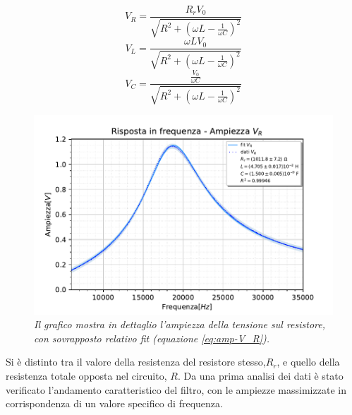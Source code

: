 \begin{equation}\label{eq:amp-V_R}
    V_R = \frac{R_rV_0}{\sqrt{ R^2 +{ \left(\omega L - \frac{1}{\omega C}\right)}^2}}
\end{equation}
\begin{equation}
    V_L = \frac{\omega L V_0}{\sqrt{R^2+{ \left(\omega L - \frac{1}{\omega C}\right)}^2}}
\end{equation}
\begin{equation}
    V_C = \frac{\frac{V_0}{\omega C}}{\sqrt{R^2+{ \left(\omega L - \frac{1}{\omega C}\right)}^2}}
\end{equation}


\begin{figure}[h]
    \centering
    \includegraphics[width=.9\textwidth]{../figs/Risposta-in-frequenza-ampiezza-resistenza.pdf}
    \caption{\emph{Il grafico mostra in dettaglio l'ampiezza della tensione sul resistore, con sovrapposto relativo fit
        (equazione \ref{eq:amp-V_R}).}}\label{fig:ampiezzeR}
\end{figure}

Si è distinto tra il valore della resistenza del resistore stesso,$R_r$, e quello della resistenza totale opposta nel
circuito, $R$.
Da una prima analisi dei dati è stato verificato l'andamento caratteristico del filtro, con le ampiezze massimizzate
in corrispondenza di un valore specifico di frequenza.

